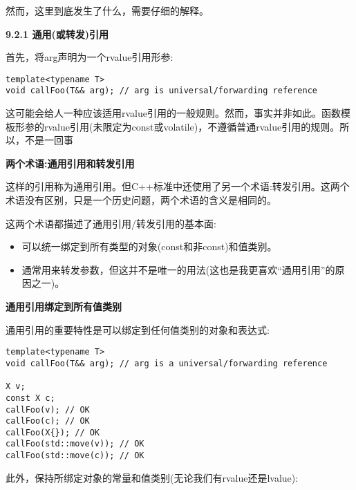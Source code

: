 然而，这里到底发生了什么，需要仔细的解释。\par

\hspace*{\fill} \par %
\textbf{9.2.1 通用(或转发)引用}

首先，将arg声明为一个rvalue引用形参:\par

\begin{lstlisting}[caption={}]
template<typename T>
void callFoo(T&& arg); // arg is universal/forwarding reference
\end{lstlisting}

这可能会给人一种应该适用rvalue引用的一般规则。然而，事实并非如此。函数模板形参的rvalue引用(未限定为const或volatile)，不遵循普通rvalue引用的规则。所以，不是一回事\par

\hspace*{\fill} \par %
\textbf{两个术语:通用引用和转发引用}

这样的引用称为通用引用。但C++标准中还使用了另一个术语:转发引用。这两个术语没有区别，只是一个历史问题，两个术语的含义是相同的。\par

这两个术语都描述了通用引用/转发引用的基本面:\par

\begin{itemize}
	\item 可以统一绑定到所有类型的对象(const和非const)和值类别。
	\item 通常用来转发参数，但这并不是唯一的用法(这也是我更喜欢“通用引用”的原因之一)。
\end{itemize}

\hspace*{\fill} \par %
\textbf{通用引用绑定到所有值类别}

通用引用的重要特性是可以绑定到任何值类别的对象和表达式:\par

\begin{lstlisting}[caption={}]
template<typename T>
void callFoo(T&& arg); // arg is a universal/forwarding reference

X v;
const X c;
callFoo(v); // OK
callFoo(c); // OK
callFoo(X{}); // OK
callFoo(std::move(v)); // OK
callFoo(std::move(c)); // OK
\end{lstlisting}

此外，保持所绑定对象的常量和值类别(无论我们有rvalue还是lvalue):\par


